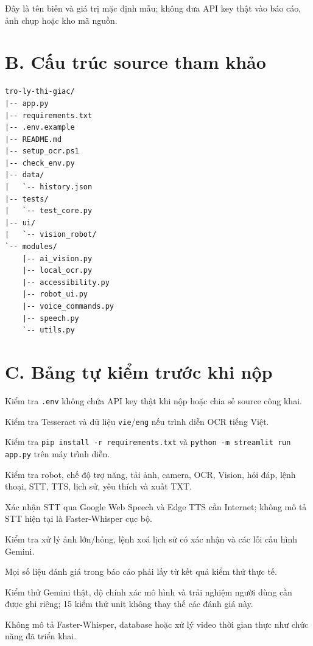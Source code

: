 Đây là tên biến và giá trị mặc định mẫu; không đưa API key thật vào báo cáo,
ảnh chụp hoặc kho mã nguồn.

\section*{B. Cấu trúc source tham khảo}
{}

\begin{lstlisting}[caption={Cấu trúc chính của source VisionAI Pro.}]
tro-ly-thi-giac/
|-- app.py
|-- requirements.txt
|-- .env.example
|-- README.md
|-- setup_ocr.ps1
|-- check_env.py
|-- data/
|   `-- history.json
|-- tests/
|   `-- test_core.py
|-- ui/
|   `-- vision_robot/
`-- modules/
    |-- ai_vision.py
    |-- local_ocr.py
    |-- accessibility.py
    |-- robot_ui.py
    |-- voice_commands.py
    |-- speech.py
    `-- utils.py
\end{lstlisting}

\section*{C. Bảng tự kiểm trước khi nộp}
{}

\begin{tukiem}
  \item Kiểm tra \texttt{.env} không chứa API key thật khi nộp hoặc chia sẻ source công khai.
  \item Kiểm tra Tesseract và dữ liệu \texttt{vie}/\texttt{eng} nếu trình diễn OCR tiếng Việt.
  \item Kiểm tra \texttt{pip install -r requirements.txt} và \texttt{python -m streamlit run app.py} trên máy trình diễn.
  \item Kiểm tra robot, chế độ trợ năng, tải ảnh, camera, OCR, Vision, hỏi đáp, lệnh thoại, STT, TTS, lịch sử, yêu thích và xuất TXT.
  \item Xác nhận STT qua Google Web Speech và Edge TTS cần Internet; không mô tả STT hiện tại là Faster-Whisper cục bộ.
  \item Kiểm tra xử lý ảnh lớn/hỏng, lệnh xoá lịch sử có xác nhận và các lỗi cấu hình Gemini.
  \item Mọi số liệu đánh giá trong báo cáo phải lấy từ kết quả kiểm thử thực tế.
  \item Kiểm thử Gemini thật, độ chính xác mô hình và trải nghiệm người dùng cần được ghi riêng; 15 kiểm thử unit không thay thế các đánh giá này.
  \item Không mô tả Faster-Whisper, database hoặc xử lý video thời gian thực như chức năng đã triển khai.
\end{tukiem}

